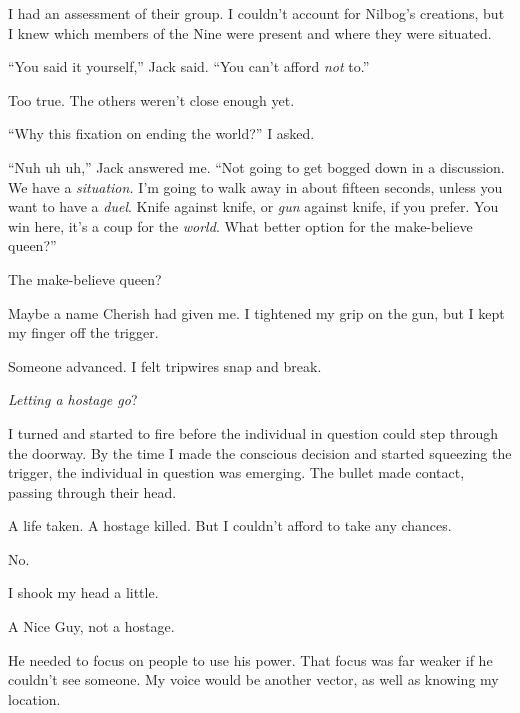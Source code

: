 I had an assessment of their group.  I couldn't account for Nilbog's creations, but I knew which members of the Nine were present and where they were situated.



``You said it yourself,'' Jack said.  ``You can't afford \emph{not} to.''



Too true.  The others weren't close enough yet.



``Why this fixation on ending the world?'' I asked.



``Nuh uh uh,'' Jack answered me.  ``Not going to get bogged down in a discussion.  We have a \emph{situation.  }I'm going to walk away in about fifteen seconds, unless you want to have a \emph{duel}.  Knife against knife, or \emph{gun} against knife, if you prefer.  You win here, it's a coup for the \emph{world}.  What better option for the make-believe queen?''



The make-believe queen?



Maybe a name Cherish had given me.  I tightened my grip on the gun, but I kept my finger off the trigger.



Someone advanced.  I felt tripwires snap and break.



\emph{Letting a hostage go}?



I turned and started to fire before the individual in question could step through the doorway.  By the time I made the conscious decision and started squeezing the trigger, the individual in question was emerging.  The bullet made contact, passing through their head.



A life taken.  A hostage killed.  But I couldn't afford to take any chances.



No.



I shook my head a little.



A Nice Guy, not a hostage.



He needed to focus on people to use his power.  That focus was far weaker if he couldn't see someone.  My voice would be another vector, as well as knowing my location.



